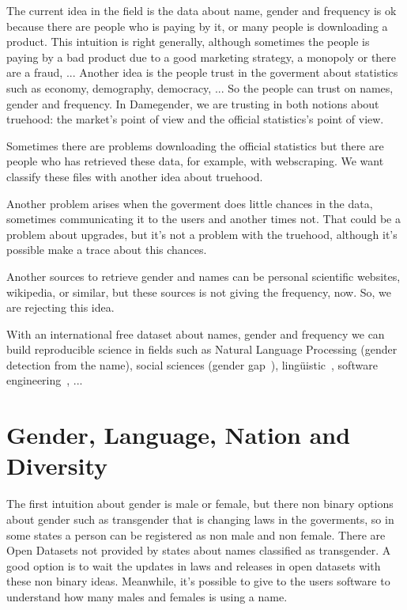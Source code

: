 \documentclass[a4paper]{article}
\begin{document}
The current idea in the field is the data about name, gender and
frequency is ok because there are people who is paying by it, or many
people is downloading a product. This intuition is right generally,
although sometimes the people is paying by a bad product due to a good
marketing strategy, a monopoly or there are a fraud, ... Another idea
is the people trust in the goverment about statistics such as economy,
demography, democracy, ... So the people can trust on names, gender
and frequency. In Damegender, we are trusting in both notions about
truehood: the market's point of view and the official statistics's
point of view.

Sometimes there are problems downloading the official statistics but
there are people who has retrieved these data, for example, with
webscraping. We want classify these files with another idea about
truehood.

Another problem arises when the goverment does little chances in the
data, sometimes communicating it to the users and another times
not. That could be a problem about upgrades, but it's not a problem
with the truehood, although it's possible make a trace about this
chances.

Another sources to retrieve gender and names can be personal
scientific websites, wikipedia, or similar, but these sources is not
giving the frequency, now. So, we are rejecting this idea. 

With an international free dataset about names, gender and frequency
we can build reproducible science in fields such as Natural Language
Processing (gender detection from the name), social sciences (gender
gap~\cite{holman2018gender,mislove2011understanding}),
lingüistic~\cite{lawson2005russian,krueger1962mongolian,van2020gender},
software engineering~\cite{vasilescu2012gender}, ...



\section{Gender, Language, Nation and Diversity}
\label{sec:diversity}

The first intuition about gender is male or female, but there non
binary options about gender such as transgender that is changing laws
in the goverments, so in some states a person can be registered as non
male and non female. There are Open Datasets not provided by states
about names classified as transgender. A good option is to wait the
updates in laws and releases in open datasets with these non binary
ideas. Meanwhile, it's possible to give to the users software to
understand how many males and females is using a name.
\end{document}
